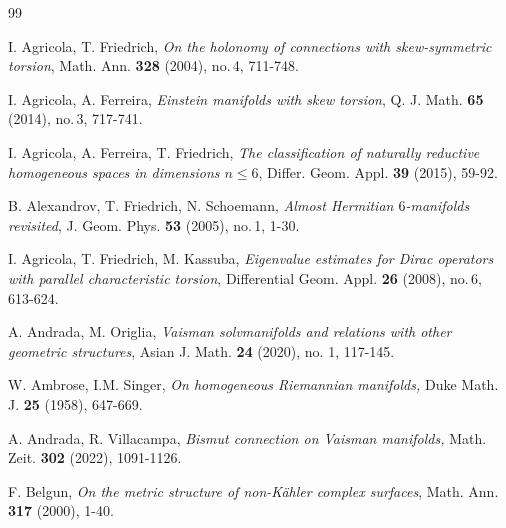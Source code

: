 \documentclass{amsart}
\numberwithin{equation}{section}
\theoremstyle{definition}
\renewcommand{\1}{\mathds{1}}
\renewcommand{\>}{\rightarrow}
\begin{document}
\vspace{0.2cm}


\begin{thebibliography}{99}

 I. Agricola, T. Friedrich,
\newblock \textit{On the holonomy of connections with skew-symmetric torsion},
\newblock Math. Ann. \textbf{328} (2004), no.\,4, 711-748.

 I. Agricola, A. Ferreira,
\newblock \textit{Einstein manifolds with skew torsion},
\newblock Q. J. Math. {\bf 65} (2014), no.\,3, 717-741.

 I. Agricola, A. Ferreira, T. Friedrich,
\newblock \textit{The classification of naturally reductive homogeneous spaces in dimensions $n\leq6$},
\newblock Differ. Geom. Appl. {\bf 39} (2015), 59-92.

 B. Alexandrov, T. Friedrich, N. Schoemann,
\newblock \textit{Almost Hermitian $6$-manifolds revisited},
\newblock J. Geom. Phys. {\bf 53} (2005), no.\,1, 1-30.

 I. Agricola, T. Friedrich, M. Kassuba,
\newblock \textit{Eigenvalue estimates for Dirac operators with parallel characteristic torsion},
\newblock Differential Geom. Appl. \textbf{26} (2008), no.\,6, 613-624.

 A. Andrada, M. Origlia,
\newblock \textit{Vaisman solvmanifolds and relations with other geometric structures},
\newblock Asian J. Math. \textbf{24} (2020), no. 1, 117-145.

 W. Ambrose, I.M. Singer,
\newblock \textit{On homogeneous Riemannian manifolds,}
\newblock Duke Math. J. {\bf 25} (1958), 647-669.

 A. Andrada, R. Villacampa,
\newblock \textit{Bismut connection on Vaisman manifolds,}
\newblock Math. Zeit. \textbf{302} (2022), 1091-1126.



 F. Belgun,
\newblock \textit{On the metric structure of non-K\"ahler complex surfaces},
\newblock Math. Ann. \textbf{317} (2000), 1-40.


\end{thebibliography}
\end{document}
